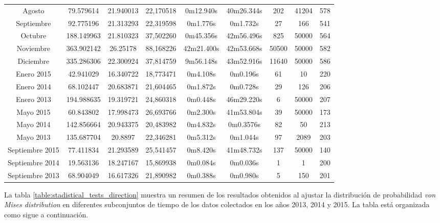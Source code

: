 \begin{table}[ht!]
{\begin{tabular}{|c|c|c|c|c|c|c|c|c|}
        Agosto          & 79.579614     & 21.940013     & 22,170518     & 0m12.940s     & 40m26.344s    & 202   & 41204 & 578 \\
        Septiembre      & 92.775196     & 21.313293     & 22,319598     & 0m1.776s      & 0m1.732s      & 27    & 166   & 541 \\
        Octubre         & 188.149963    & 21.810323     & 37,502260     & 0m45.356s     & 42m56.496s    & 825   & 50000 & 564 \\
        Noviembre       & 363.902142    & 26.25178      & 88,168226     & 42m21.400s    & 42m53.668s    & 50500 & 50000 & 582 \\
        Diciembre       & 335.286306    & 22.300924     & 37,814759     & 9m56.148s     & 43m52.916s    & 11640 & 50000 & 586 \\
        \hline 
        Enero 2015      & 42.941029     & 16.340722     & 18,773471     & 0m4.108s      & 0m0.196s      & 61    & 10    & 220 \\
        Enero 2014      & 68.102447     & 20.683871     & 21,604465     & 0m1.872s      & 0m0.728s      & 29    & 126   & 206 \\
        Enero 2013      & 194.988635    & 19.319721     & 24,860318     & 0m0.448s      & 46m29.220s    & 6     & 50000 & 207 \\
        Mayo 2015       & 60.843802     & 17.998473     & 26,693766     & 0m2.300s      & 41m53.804s    & 39    & 50000 & 173 \\
        Mayo 2014       & 142.856664    & 20.943375     & 20,483982     & 0m4.832s      & 0m0.3576s     & 82    & 50    & 213 \\
        Mayo 2013       & 135.687704    & 20.8897       & 22,346281     & 0m5.312s      & 0m1.044s      & 97    & 2089  & 203 \\
        Septiembre 2015 & 77.411834     & 21.293589     & 25,541457     & 0m8.420s      & 41m48.732s    & 137   & 50000 & 140 \\
        Septiembre 2014 & 19.563136     & 18.247167     & 15,869938     & 0m0.084s      & 0m0.036s      & 1     & 1     & 200 \\
        Septiembre 2013 & 68.904049     & 16.617326     & 21,890982     & 0m0.388s      & 0m0.980s      & 5     & 150   & 201 \\
        \hline  
    \end{tabular}
    }   
\end{table}
La tabla \ref{table:stadistical_tests_direction} muestra un resumen de los resultados obtenidos al ajustar la distribución de probabilidad \emph{von Mises distribution} en diferentes subconjuntos de tiempo de los datos colectados en los años 2013, 2014 y 2015. La tabla está organizada como sigue a continuación.
